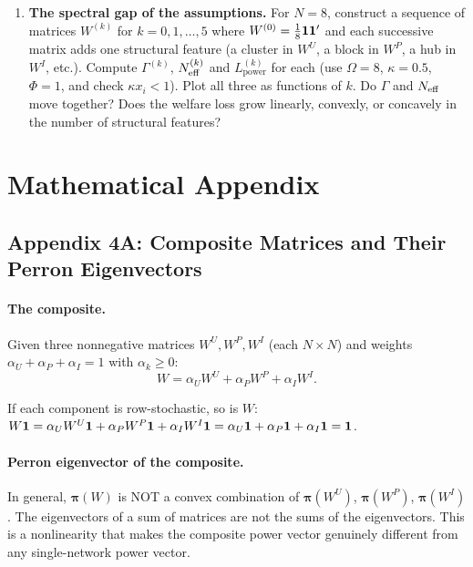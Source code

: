 \documentclass[../structural_economics_book.tex]{subfiles}
\begin{document}
\begin{enumerate}[label=\textbf{4.\arabic*}, leftmargin=3em]
\item \textbf{The spectral gap of the assumptions.} For $N = 8$, construct a sequence of matrices $W^{(k)}$ for $k = 0, 1, \ldots, 5$ where $W^{(0)} = \frac{1}{8}\mathbf{1}\mathbf{1}'$ and each successive matrix adds one structural feature (a cluster in $W^U$, a block in $W^P$, a hub in $W^I$, etc.). Compute $\Gamma^{(k)}$, $N_{\text{eff}}^{(k)}$ and $L^{(k)}_{\text{power}}$ for each (use $\Omega = 8$, $\kappa = 0.5$, $\Phi = 1$, and check $\kappa x_i < 1$). Plot all three as functions of $k$. Do $\Gamma$ and $N_{\text{eff}}$ move together? Does the welfare loss grow linearly, convexly, or concavely in the number of structural features?

\end{enumerate}


\newpage
\section*{Mathematical Appendix}

\subsection*{Appendix 4A: Composite Matrices and Their Perron Eigenvectors}
\label{ch04:app:composite}

\paragraph{The composite.} Given three nonnegative matrices $W^U, W^P, W^I$ (each $N \times N$) and weights $\alpha_U + \alpha_P + \alpha_I = 1$ with $\alpha_k \geq 0$:
\begin{equation}
W = \alpha_U W^U + \alpha_P W^P + \alpha_I W^I.
\end{equation}

If each component is row-stochastic, so is $W$: $W\mathbf{1} = \alpha_U W^U\mathbf{1} + \alpha_P W^P\mathbf{1} + \alpha_I W^I\mathbf{1} = \alpha_U\mathbf{1} + \alpha_P\mathbf{1} + \alpha_I\mathbf{1} = \mathbf{1}$.

\paragraph{Perron eigenvector of the composite.} In general, $\boldsymbol{\pi}(W)$ is NOT a convex combination of $\boldsymbol{\pi}(W^U)$, $\boldsymbol{\pi}(W^P)$, $\boldsymbol{\pi}(W^I)$. The eigenvectors of a sum of matrices are not the sums of the eigenvectors. This is a nonlinearity that makes the composite power vector genuinely different from any single-network power vector.
\end{document}
